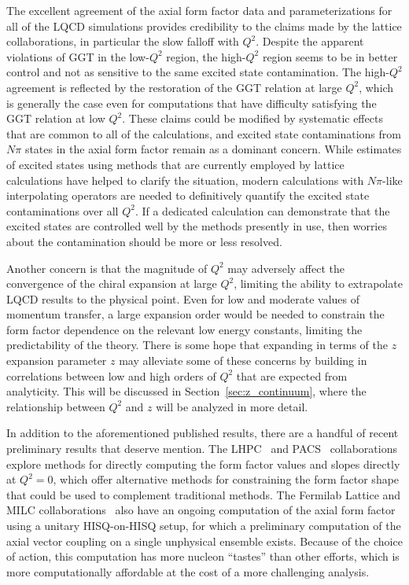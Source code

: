 \documentclass{ar-1col}
\begin{document}
The excellent agreement of the axial form factor data and parameterizations
 for all of the LQCD simulations provides credibility to the claims
 made by the lattice collaborations, in particular the slow falloff with $Q^2$.
Despite the apparent violations of GGT in the low-$Q^2$ region,
 the high-$Q^2$ region seems to be in better control and not as sensitive to
 the same excited state contamination.
The high-$Q^2$ agreement is reflected by the restoration of the GGT relation at large $Q^2$,
 which is generally the case even for computations that have difficulty satisfying
 the GGT relation at low $Q^2$.
These claims could be modified by systematic effects
 that are common to all of the calculations,
 and excited state contaminations from $N\pi$ states in
 the axial form factor remain as a dominant concern.
While estimates of excited states using methods that are currently employed
 by lattice calculations have helped to clarify the situation,
 modern calculations with $N\pi$-like interpolating operators
 are needed to definitively quantify the excited state contaminations over all $Q^2$.
If a dedicated calculation can demonstrate that the
 excited states are controlled well by the methods presently in use,
 then worries about the contamination should be more or less resolved.

Another concern is that the magnitude of $Q^2$ may adversely affect
 the convergence of the chiral expansion at large $Q^2$,
 limiting the ability to extrapolate LQCD results to the physical point.
Even for low and moderate values of momentum transfer,
 a large expansion order would be needed to constrain the form factor
 dependence on the relevant low energy constants,
 limiting the predictability of the theory.
There is some hope that expanding in terms of the $z$ expansion parameter $z$
 may alleviate some of these concerns by building in correlations between
 low and high orders of $Q^2$ that are expected from analyticity.
This will be discussed in Section~\ref{sec:z_continuum},
 where the relationship between $Q^2$ and $z$ will be analyzed in more detail.


In addition to the aforementioned published results, there are
 a handful of recent preliminary results that deserve mention.
The LHPC~\cite{Hasan:2017wwt} and PACS~\cite{Ishikawa:2021eut} collaborations
 explore methods for directly computing the form factor values and slopes
 directly at $Q^2=0$, which offer alternative methods for constraining
 the form factor shape that could be used to complement traditional methods.
The Fermilab Lattice and MILC collaborations~\cite{Meyer:2016kwb,Lin:2019pia,Lin:2020wko} also have an ongoing
 computation of the axial form factor using a unitary HISQ-on-HISQ setup,
 for which a preliminary computation of the axial vector coupling on
 a single unphysical ensemble exists.
Because of the choice of action, this computation has more nucleon ``tastes''
 than other efforts, which is more computationally affordable
 at the cost of a more challenging analysis.
\end{document}
